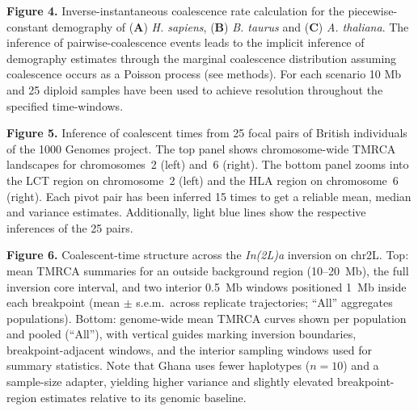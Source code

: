 \documentclass[9pt,twocolumn,twoside]{pnas-new}
\begin{document}
\textbf{Figure 4.}
Inverse-instantaneous coalescence rate calculation for the piecewise-constant demography of
(\textbf{A}) \textit{H. sapiens}, (\textbf{B}) \textit{B. taurus} and (\textbf{C}) \textit{A. thaliana}.
The inference of pairwise-coalescence events leads to the implicit inference of demography estimates
through the marginal coalescence distribution assuming coalescence occurs as a Poisson process (see methods).
For each scenario 10 Mb and 25 diploid samples have been used to achieve resolution throughout the specified time-windows.

\textbf{Figure 5.}
Inference of coalescent times from 25 focal pairs of British individuals of the 1000 Genomes project. The top panel shows chromosome-wide TMRCA landscapes for chromosomes~2 (left) and~6 (right). The bottom panel zooms into the LCT region on chromosome~2 (left) and the HLA region on chromosome~6 (right). Each pivot pair has been inferred 15 times to get a reliable mean, median and variance estimates. Additionally, light blue lines show the respective inferences of the 25 pairs.

\textbf{Figure 6.}
Coalescent-time structure across the \emph{In(2L)a} inversion on chr2L.
Top: mean TMRCA summaries for an outside background region (10--20~Mb), the full inversion core interval, and two interior 0.5~Mb windows positioned 1~Mb inside each breakpoint (mean $\pm$ s.e.m.\ across replicate trajectories; ``All'' aggregates populations).
Bottom: genome-wide mean TMRCA curves shown per population and pooled (``All''), with vertical guides marking inversion boundaries, breakpoint-adjacent windows, and the interior sampling windows used for summary statistics.
Note that Ghana uses fewer haplotypes ($n=10$) and a sample-size adapter, yielding higher variance and slightly elevated breakpoint-region estimates relative to its genomic baseline.
\end{document}
